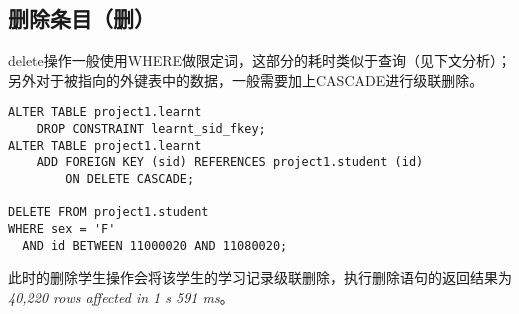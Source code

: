 \subsection{删除条目（删）}
delete操作一般使用WHERE做限定词，这部分的耗时类似于查询（见下文分析）；另外对于被指向的外键表中的数据，一般需要加上CASCADE进行级联删除。
\begin{lstlisting}
ALTER TABLE project1.learnt
    DROP CONSTRAINT learnt_sid_fkey;
ALTER TABLE project1.learnt
    ADD FOREIGN KEY (sid) REFERENCES project1.student (id)
        ON DELETE CASCADE;
        
DELETE FROM project1.student
WHERE sex = 'F'
  AND id BETWEEN 11000020 AND 11080020;
\end{lstlisting}
\vspace{-2.3em}
\par 此时的删除学生操作会将该学生的学习记录级联删除，执行删除语句的返回结果为\textit{40,220 rows affected in 1 s 591 ms}。